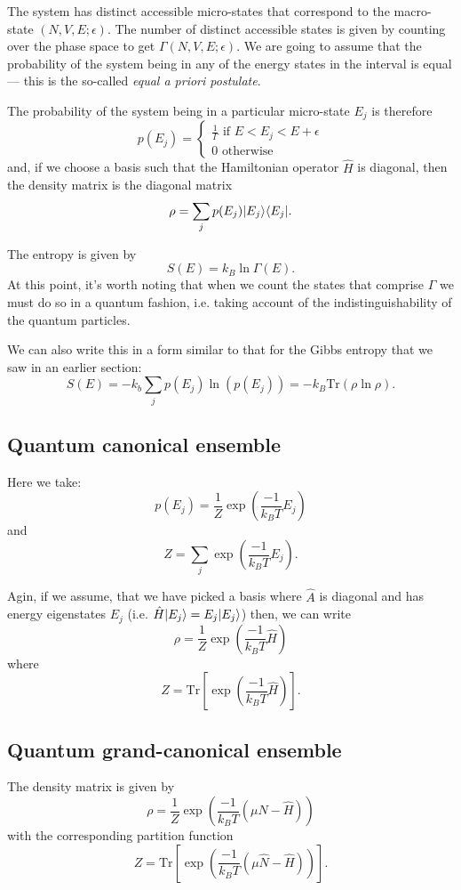 The system has distinct accessible micro-states that correspond to the macro-state $(N,V,E;\epsilon)$. The number of distinct accessible states is given by counting over the phase space to get $\Gamma(N,V,E;\epsilon)$. We are going to assume that the probability of the system being in any of the energy states in the interval is equal --- this is the so-called \emph{equal a priori postulate}.

The probability of the system being in a particular micro-state $E_j$ is therefore
$$
	p(E_j) =
	\begin{cases}
		\frac{1}{\Gamma} \text{ if } E<E_j<E+\epsilon\\
		0 \text{ otherwise}
	\end{cases}
$$
and, if we choose a basis such that the Hamiltonian operator $\hat{H}$ is diagonal, then the density matrix is the diagonal matrix
$$
	\rho = \sum_j p(E_j) | E_j \rangle\langle E_j |.
$$

The entropy is given by
$$
	S(E) = k_B\ln\Gamma(E).
$$
At this point, it's worth noting that when we count the states that comprise $\Gamma$ we must do so in a quantum fashion, i.e. taking account of the indistinguishability of the quantum particles.

We can also write this in a form similar to that for the Gibbs entropy that we saw in an earlier section:
$$
	S(E) = -k_b\sum_jp(E_j)\ln(p(E_j))=-k_B\text{Tr}(\rho\ln\rho).
$$ 

\subsection{Quantum canonical ensemble}
Here we take:
$$
	p(E_j) = \frac{1}{Z}\exp\left(\frac{-1}{k_BT}E_j\right)
$$
and
$$
	Z = \sum_j \exp\left(\frac{-1}{k_BT}E_j\right).
$$

Agin, if we assume, that we have picked a basis where $\hat{A}$ is diagonal and has energy eigenstates $E_j$ (i.e. $\hat{H}| E_j \rangle = E_j| E_j \rangle$) then, we can write
$$
	\rho = \frac{1}{Z}\exp\left(\frac{-1}{k_BT}\hat{H}\right)
$$
where
$$
	Z = \text{Tr}\left[\exp\left(\frac{-1}{k_BT}\hat{H}\right)\right].
$$

\subsection{Quantum grand-canonical ensemble}
The density matrix is given by
$$
	\rho = \frac{1}{Z}\exp\left(\frac{-1}{k_BT}(\mu\hat{N}-\hat{H})\right)
$$
with the corresponding partition function
$$
	Z = \text{Tr}\left[\exp\left(\frac{-1}{k_BT}(\mu\hat{N}-\hat{H})\right)\right].
$$

